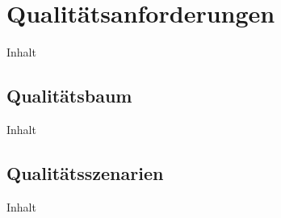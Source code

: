 \chapter{Qualitätsanforderungen\label{chap10:Zehntes-Kapitel}}

Inhalt

\section{Qualitätsbaum\label{sec10.1:Unterpunkt-1}}

Inhalt

\section{Qualitätsszenarien\label{sec10.2:Unterpunkt-2}}

Inhalt